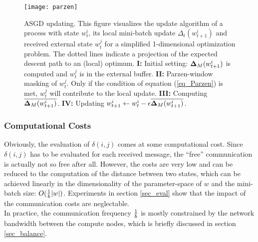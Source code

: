 \documentclass{acm_proc_article-sp}
\begin{document}
\begin{figure*}
\texttt{[image: parzen]}
\caption{ASGD updating. This figure visualizes the update algorithm 
of a process with state $w^i_t$, its local mini-batch update 
$\Delta_t(w^i_{t+1})$ and received external state  $w^j_t$ for a 
simplified 1-dimensional optimization problem. The dotted lines indicate 
a projection of the expected descent path to an (local) optimum. 
{\bf I:} Initial setting: ${\bf \Delta}_M(w^i_{t+1})$ is computed and $w^j_t$ 
is in the external
buffer.
{\bf II:} Parzen-window masking of $w^j_t$. Only if the condition of equation 
(\ref{eq_Parzen}) is
met, $w^j_t$ will contribute to the local update.
{\bf III:} Computing $\overline{{\bf\Delta}_M(w^i_{t+1})}$.
{\bf IV:} Updating $w^i_{t+1} \leftarrow w^i_t -\epsilon\overline{{\bf\Delta}_M
(w^i_{t+1})}$.   
\label{fig_ASGD_pWindow}
}
\end{figure*}

\subsubsection*{Computational Costs}
Obviously, the evaluation of $\delta(i,j)$ comes at some computational cost.
Since $\delta(i,j)$
has to be evaluated for each received message,
the ``free'' communication is actually not so free after all.
However, the costs are very low and can be reduced  
 to the computation of the distance between two states, which can be
achieved linearly in the dimensionality of the parameter-space of $w$ and the mini-batch size: 
$O({1\over b}|w|)$. Experiments in section \ref{sec_eval} show that the impact
of the communication costs are neglectable.\\
In practice, the communication frequency ${1\over b}$ is mostly constrained by the 
network bandwidth between the compute nodes, which is briefly discussed in section
\ref{sec_balance}.    
\end{document}

